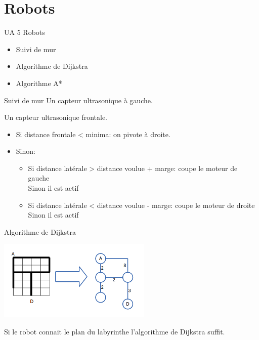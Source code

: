 \documentclass{beamer}
\begin{document}
\section{Robots}
  \begin{frame}{UA 5 Robots}
      \begin{itemize}
          \item Suivi de mur
          \item Algorithme de Dijkstra
          \item Algorithme A*
      \end{itemize}
  \end{frame}
  \begin{frame}{Suivi de mur}
    Un capteur ultrasonique à gauche.

    Un capteur ultrasonique frontale.

    \begin{itemize}
      \item Si distance frontale < minima: on pivote à droite.
      \item Sinon:
      \begin{itemize}
        \item Si distance latérale > distance voulue + marge: coupe le moteur
        de gauche \\Sinon il est actif \item Si distance latérale < distance
          voulue - marge: coupe le moteur de droite \\Sinon il est actif
      \end{itemize}
    \end{itemize}
  \end{frame}

  \begin{frame}{Algorithme de Dijkstra}
    \begin{center}
      \includegraphics[width=0.55\textwidth]{jeux/GRO_graph1} \\
    \end{center}
    Si le robot connait le plan du labyrinthe l'algorithme de Dijkstra suffit. 
  \end{frame}
\end{document}
